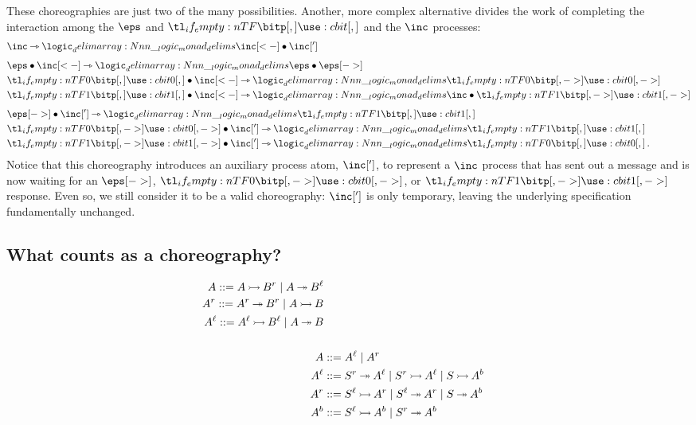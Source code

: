 

These choreographies are just two of the many possibilities.
Another, more complex alternative divides the work of completing the interaction among the $\eps$ and $\bit{}$ and the $\inc$ processes:
\begin{align*}
  &\inc \lrimp \monad{\inc[<-] \fuse \inc[']} \\[1.5\jot]
  &\eps \fuse \inc[<-] \lrimp \monad{\eps \fuse \eps[->]} \\
  &\bit{0} \fuse \inc[<-] \lrimp \monad{\bit{0}[->]} \\
  &\bit{1} \fuse \inc[<-] \lrimp \monad{\inc \fuse \bit{1}[->]} \\[1.5\jot]
  &\eps[->] \fuse \inc['] \lrimp \monad{\bit{1}} \\
  &\bit{0}[->] \fuse \inc['] \lrimp \monad{\bit{1}} \\
  &\bit{1}[->] \fuse \inc['] \lrimp \monad{\bit{0}} \,.
\end{align*}
Notice that this choreography introduces an auxiliary process atom, $\inc[']$, to represent a $\inc$ process that has sent out a message and is now waiting for an $\eps[->]$, $\bit{0}[->]$, or $\bit{1}[->]$ response.
Even so, we still consider it to be a valid choreography: $\inc[']$ is only temporary, leaving the underlying specification fundamentally unchanged.


\subsection{What counts as a choreography?}\label{sec:what-counts-choreo}

\begin{align*}
    A ::= A \mathbin{\rightarrowtail} B^r \mid A \mathbin{\twoheadrightarrow} B^\ell \\
  A^r ::= A^r \mathbin{\twoheadrightarrow} B^r \mid A \mathbin{\rightarrowtail} B \\
  A^\ell ::= A^\ell \mathbin{\rightarrowtail} B^\ell \mid A \mathbin{\twoheadrightarrow} B \\
  \\
  A &::= A^\ell \mid A^r \\
  A^\ell &::= S^r \mathbin{\twoheadrightarrow} A^\ell \mid S^r \mathbin{\rightarrowtail} A^\ell \mid S \mathbin{\rightarrowtail} A^b \\
  A^r &::= S^\ell \mathbin{\rightarrowtail} A^r \mid S^\ell \mathbin{\twoheadrightarrow} A^r \mid S \mathbin{\twoheadrightarrow} A^b \\
  A^b &::= S^\ell \mathbin{\rightarrowtail} A^b \mid S^r \mathbin{\twoheadrightarrow} A^b
\end{align*}


